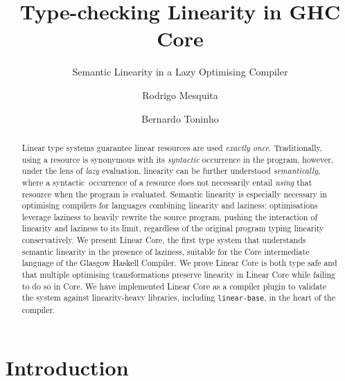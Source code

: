 \documentclass[acmsmall, screen, review]{acmart}
\title{Type-checking Linearity in GHC Core}
\subtitle{Semantic Linearity in a Lazy Optimising Compiler}
\author{Rodrigo Mesquita}
\affiliation{
  \department{Departamento de Inform\'{a}tica}
  \institution{FCT-NOVA, Universidade Nova de Lisboa}
  \country{Portugal}}
\affiliation{
   \institution{Well-Typed}
   \country{Something}}
\author{Bernardo Toninho}
\affiliation{
  \department{Departamento de Inform\'{a}tica}
  \institution{NOVA-LINCS, FCT-NOVA, Universidade Nova de Lisboa}
  \country{Portugal}}
\begin{document}
\begin{abstract}
Linear type systems guarantee linear resources are used \emph{exactly once}.
Traditionally, using a resource is synonymous with its \emph{syntactic}
occurrence in the program, however, under the lens of \emph{lazy} evaluation,
linearity can be further understood \emph{semantically}, where a
syntactic occurrence of a resource does not necessarily entail
\emph{using} that resource when the program is evaluated.
%
Semantic linearity is especially necessary in optimising compilers for
languages combining linearity and laziness: optimisations leverage laziness to
heavily rewrite the source program, pushing the interaction of linearity and
laziness to its limit, regardless of the original program typing linearity
conservatively.
%
We present Linear Core, the first type system that understands semantic
linearity in the presence of laziness, suitable for the Core intermediate
language of the Glasgow Haskell Compiler. We prove Linear Core is both type
safe and that multiple optimising transformations preserve linearity in Linear
Core while failing to do so in Core. We have implemented Linear Core as a
compiler plugin to validate the system against linearity-heavy libraries,
including \texttt{linear-base}, in the heart of the compiler.
\end{abstract}

\maketitle

\section{Introduction}

\end{document}
